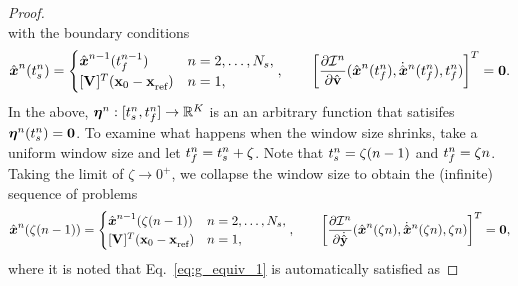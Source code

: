 \begin{proof}
\begin{equation}
\end{equation}
with the boundary conditions
\begin{equation*}
 \genstate^n(\timeStartArg{n})  = 
\begin{cases}
\genstate^{n-1}(\timeEndArg{n-1}) & n=2,\ldots,\nslabs, \\
\genstateIC & n=1, \end{cases}, \qquad 
\bigg[\frac{\partial \minintegrandArg{n}}{\partial \genstateyDiscreteDot}(\genstateArg{n}{\timeEndArg{n}},\genstateDotArg{n}{\timeEndArg{n}},\timeEndArg{n}) \bigg]^T= \boldsymbol 0.
\end{equation*}
In the above, $\boldsymbol \eta^{n}: [t_s^{n},t_f^{n}] \rightarrow \mathbb{R}^{K}$ is an an arbitrary function that satisifes $\boldsymbol \eta^{n}(t_s^{n}) = \boldsymbol 0$. 
To examine what happens when the window size shrinks, take a uniform window size and let $t_f^{n} = t_s^{n} + \zeta$. Note that $t_s^{n} = \zeta (n-1)$ and $t_f^{n} = \zeta n$. %
Taking the limit of $\zeta \rightarrow 0^+$, we collapse the window size to obtain the (infinite) sequence of problems
\begin{equation*}
 \genstateArg{n}{\zeta(n-1)} = 
\begin{cases}
\genstate^{n-1}(\zeta(n-1)) & n=2,\ldots,\nslabs,\\
\genstateIC & n=1, \end{cases}, \qquad
\bigg[ \frac{\partial \minintegrandArg{n}}{\partial \dot{\genstateyDiscrete}}(\genstateArg{n}{\zeta n},\genstateDotArg{n}{\zeta n},\zeta n) \bigg]^T= \boldsymbol 0,
\end{equation*}
where it is noted that Eq.~\eqref{eq:g_equiv_1} is automatically satisfied as

\end{proof}
